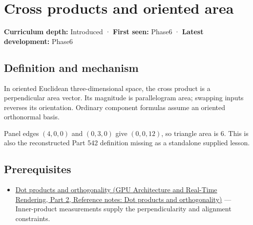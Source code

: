 \hypertarget{appendix-2391db8052b1}{}\label{referencestart:appendix-2391db8052b1}
\section{Cross products and oriented area}\label{appendix-2391db8052b1-cross-products-and-oriented-area}

\hypertarget{appendix-2391db8052b1-cross-products-and-oriented-area}{}

\textbf{Curriculum depth:} Introduced · \textbf{First seen:} Phase6 · \textbf{Latest development:} Phase6

\begin{allmightroledefinition}

\subsection{Definition and mechanism}\label{appendix-2391db8052b1-definition-and-mechanism}

\hypertarget{appendix-2391db8052b1-definition-and-mechanism}{}

In oriented Euclidean three-dimensional space, the cross product is a perpendicular area vector. Its magnitude is parallelogram area; swapping inputs reverses its orientation. Ordinary component formulas assume an oriented orthonormal basis.

\end{allmightroledefinition}

Panel edges \((4,0,0)\) and \((0,3,0)\) give \((0,0,12)\), so triangle area is \(6\). This is also the reconstructed Part 542 definition missing as a standalone supplied lesson.

\subsection{Prerequisites}\label{appendix-2391db8052b1-prerequisites}

\hypertarget{appendix-2391db8052b1-prerequisites}{}

\begin{itemize}
\tightlist
\item
  \href{../06-GPU-Architecture-and-Real-Time-Rendering-P02/main.pdf\#appendix-8bc4e8fc547c}{Dot products and orthogonality (GPU Architecture and Real-Time Rendering, Part 2, Reference notes: Dot products and orthogonality)} --- Inner-product measurements supply the perpendicularity and alignment constraints.
\end{itemize}

